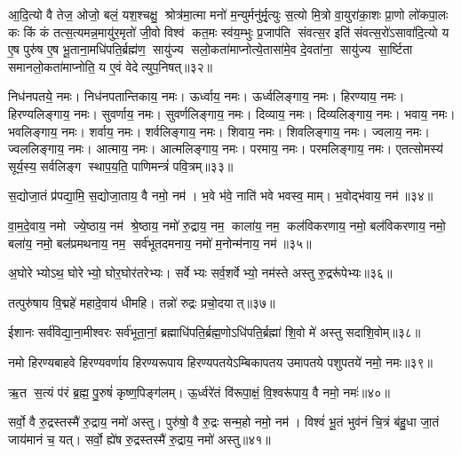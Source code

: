 आ॒दि॒त्यो वै तेज॒ ओजो॒ बलं॒ यश॒श्चक्षु॒ श्रोत्र॑मा॒त्मा मनो॑ म॒न्युर्मनु॑र्मृ॒त्युः स॒त्यो मि॒त्रो वा॒युरा॑का॒शः प्रा॒णो लो॑कपा॒लः कः किं कं तत्स॒त्यमन्न॒मायु॑र॒मृतो॑ जी॒वो विश्व॑ कत॒मः स्व॑य॒म्भुः प्र॒जाप॑ति संवत्स॒र इति॑ संवत्स॒रो॑ऽसावा॑दि॒त्यो य ए॒ष पुरु॑ष ए॒ष भू॒ताना॒मधि॑पति॒र्ब्रह्म॑ण॒ सायु॑ज्य सलो॒कता॑माप्नोत्ये॒तासा॑मे॒व दे॒वता॑ना॒ सायु॑ज्य सा॒र्ष्टिता समानलो॒कता॑माप्नोति॒ य ए॒वं वेदेत्युप॒निषत्॥३२॥
\anuvakamend

निध॑नपतये॒ नमः। निध॑नपतान्तिकाय॒ नमः। ऊर्ध्वाय॒ नमः। ऊर्ध्वलिङ्गाय॒ नमः। हिरण्याय॒ नमः। हिरण्यलिङ्गाय॒ नमः। सुवर्णाय॒ नमः। सुवर्णलिङ्गाय॒ नमः। दिव्याय॒ नमः। दिव्यलिङ्गाय॒ नमः। भवाय॒ नमः। भवलिङ्गाय॒ नमः। शर्वाय॒ नमः। शर्वलिङ्गाय॒ नमः। शिवाय॒ नमः। शिवलिङ्गाय॒ नमः। ज्वलाय॒ नमः। ज्वललिङ्गाय॒ नमः। आत्माय॒ नमः। आत्मलिङ्गाय॒ नमः। परमाय॒ नमः। परमलिङ्गाय॒ नमः। एतत्सोमस्य॑ सूर्य॒स्य॒ सर्वलिङ्ग स्थाप॒य॒ति॒ पाणिमन्त्रं॑ पवि॒त्रम्॥३३॥
\anuvakamend

स॒द्योजा॒तं प्र॑पद्या॒मि॒ स॒द्योजा॒ताय॒ वै नमो॒ नम॑। भ॒वे भ॑वे॒ नाति॑ भवे भवस्व॒ माम्। भ॒वोद्भ॑वाय॒ नम॑॥३४॥
\anuvakamend

वा॒म॒दे॒वाय॒ नमो ज्ये॒ष्ठाय॒ नम॑ श्रे॒ष्ठाय॒ नमो॑ रु॒द्राय॒ नम॒ काला॑य॒ नम॒ कल॑विकरणाय॒ नमो॒ बल॑विकरणाय॒ नमो॒ बला॑य॒ नमो॒ बल॑प्रमथनाय॒ नम॒ सर्व॑भूतदमनाय॒ नमो॑ म॒नोन्म॑नाय॒ नम॑॥३५॥\anuvakamend

अ॒घोरेभ्योऽथ॒ घोरेभ्यो॒ घोर॒घोर॑तरेभ्यः। सर्वेभ्यः सर्व॒शर्वेभ्यो॒ नम॑स्ते अस्तु रु॒द्ररू॑पेभ्यः॥३६॥
\anuvakamend

तत्पुरु॑षाय वि॒द्महे॑ महादे॒वाय॑ धीमहि। तन्नो॑ रुद्रः प्रचो॒दयात्॥३७॥
\anuvakamend

ईशानः सर्व॑विद्या॒ना॒मीश्वरः सर्व॑भूता॒नां॒ ब्रह्माधि॑पति॒र्ब्रह्म॒णो\-ऽधि॑पति॒र्ब्रह्मा॑ शि॒वो मे॑ अस्तु सदाशि॒वोम्॥३८॥
\anuvakamend

नमो हिरण्यबाहवे हिरण्यवर्णाय हिरण्यरूपाय हिरण्यपतये\-ऽम्बिकापतय उमापतये पशुपतये॑ नमो॒ नमः॥३९॥
\anuvakamend

ऋ॒त स॒त्यं प॑रं ब्र॒ह्म॒ पु॒रुषं॑ कृष्ण॒पिङ्ग॑लम्। ऊ॒र्ध्वरे॑तं वि॑रूपा॒क्षं॒ वि॒श्वरू॑पाय॒ वै नमो॒ नमः॑॥४०॥
\anuvakamend

सर्वो॒ वै रु॒द्रस्तस्मै॑ रु॒द्राय॒ नमो॑ अस्तु। पुरु॑षो॒ वै रु॒द्रः सन्म॒हो नमो॒ नम॑। विश्वं॑ भू॒तं भुव॑नं चि॒त्रं ब॑हु॒धा जा॒तं जाय॑मानं च॒ यत्। सर्वो॒ ह्ये॑ष रु॒द्रस्तस्मै॑ रु॒द्राय॒ नमो॑ अस्तु॥४१॥
\anuvakamend


